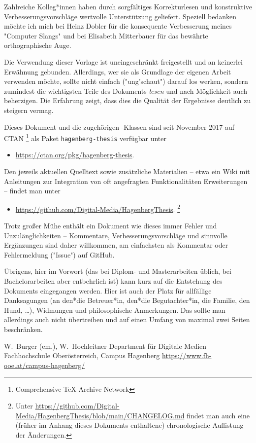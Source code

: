 Zahlreiche Kolleg*innen haben durch sorgfältiges Korrekturlesen und
konstruktive Verbesserungsvorschläge wertvolle Unterstützung geliefert.
Speziell bedanken möchte ich mich bei Heinz Dobler für die konsequente
Verbesserung meines "Computer Slangs" und bei Elisabeth Mitterbauer für das
bewährte orthographische Auge.

Die Verwendung dieser Vorlage ist uneingeschränkt freigestellt und an
keinerlei Erwähnung gebunden. Allerdings, wer sie als Grundlage der eigenen
Arbeit verwenden möchte, sollte nicht einfach ("ung'schaut") darauf los
werken, sondern zumindest die wichtigsten Teile des Dokuments \emph{lesen}
und nach Möglichkeit auch beherzigen. Die Erfahrung zeigt, dass dies die
Qualität der Ergebnisse deutlich zu steigern vermag.

Dieses Dokument und die zugehörigen \latex-Klassen sind seit November 2017
auf CTAN%
\footnote{Comprehensive TeX Archive Network} 
als Paket \texttt{hagenberg-thesis} verfügbar unter
%
\begin{itemize}
    \item[]\url{https://ctan.org/pkg/hagenberg-thesis}.
\end{itemize}
%
Den jeweils aktuellen Quelltext sowie zusätzliche Materialien -- etwa ein Wiki
mit Anleitungen zur Integration von oft angefragten Funktionalitäten \bzw
Erweiterungen -- findet man unter
%
\begin{itemize}
    \item[]\url{https://github.com/Digital-Media/HagenbergThesis}.%
    \footnote{Unter
    \url{https://github.com/Digital-Media/HagenbergThesis/blob/main/CHANGELOG.md}
    findet man auch eine (früher im Anhang dieses Dokuments enthaltene)
    chronologische Auflistung der Änderungen.}
\end{itemize}

\noindent
Trotz großer Mühe enthält ein Dokument wie dieses immer Fehler und
Unzulänglichkeiten -- Kommentare, Verbesserungsvorschläge und sinnvolle
Ergänzungen sind daher willkommen, am einfachsten als Kommentar oder
Fehlermeldung ("Issue") auf GitHub.

Übrigens, hier im Vorwort (das bei Diplom- und Masterarbeiten üblich, bei
Bachelor\-arbeiten aber entbehrlich ist) kann kurz auf die Entstehung des
Dokuments eingegangen werden. Hier ist auch der Platz für allfällige
Danksagungen (\zB an den*die Betreuer*in, den*die Begutachter*in, die
Familie, den Hund, \ldots), Widmungen und philosophische Anmerkungen. Das
sollte man allerdings auch nicht übertreiben und auf einen Umfang von maximal
zwei Seiten beschränken.

\vspace{6ex}
\noindent
W.\ Burger (em.), W.\ Hochleitner\newline
Department für Digitale Medien\newline
Fachhochschule Oberösterreich, Campus Hagenberg\newline
\url{https://www.fh-ooe.at/campus-hagenberg/}

